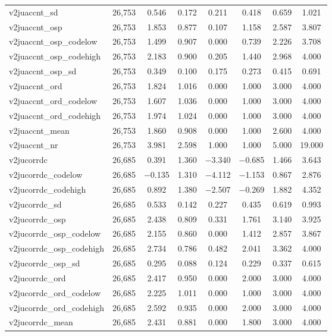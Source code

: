 \begin{table}[!htbp]
\begin{tabular}{@{\extracolsep{5pt}}lccccccc}
v2juaccnt\_sd & 26,753 & 0.546 & 0.172 & 0.211 & 0.418 & 0.659 & 1.021 \\ 
v2juaccnt\_osp & 26,753 & 1.853 & 0.877 & 0.107 & 1.158 & 2.587 & 3.807 \\ 
v2juaccnt\_osp\_codelow & 26,753 & 1.499 & 0.907 & 0.000 & 0.739 & 2.226 & 3.708 \\ 
v2juaccnt\_osp\_codehigh & 26,753 & 2.183 & 0.900 & 0.205 & 1.440 & 2.968 & 4.000 \\ 
v2juaccnt\_osp\_sd & 26,753 & 0.349 & 0.100 & 0.175 & 0.273 & 0.415 & 0.691 \\ 
v2juaccnt\_ord & 26,753 & 1.824 & 1.016 & 0.000 & 1.000 & 3.000 & 4.000 \\ 
v2juaccnt\_ord\_codelow & 26,753 & 1.607 & 1.036 & 0.000 & 1.000 & 3.000 & 4.000 \\ 
v2juaccnt\_ord\_codehigh & 26,753 & 1.974 & 1.024 & 0.000 & 1.000 & 3.000 & 4.000 \\ 
v2juaccnt\_mean & 26,753 & 1.860 & 0.908 & 0.000 & 1.000 & 2.600 & 4.000 \\ 
v2juaccnt\_nr & 26,753 & 3.981 & 2.598 & 1.000 & 1.000 & 5.000 & 19.000 \\ 
v2jucorrdc & 26,685 & 0.391 & 1.360 & $-$3.340 & $-$0.685 & 1.466 & 3.643 \\ 
v2jucorrdc\_codelow & 26,685 & $-$0.135 & 1.310 & $-$4.112 & $-$1.153 & 0.867 & 2.876 \\ 
v2jucorrdc\_codehigh & 26,685 & 0.892 & 1.380 & $-$2.507 & $-$0.269 & 1.882 & 4.352 \\ 
v2jucorrdc\_sd & 26,685 & 0.533 & 0.142 & 0.227 & 0.435 & 0.619 & 0.993 \\ 
v2jucorrdc\_osp & 26,685 & 2.438 & 0.809 & 0.331 & 1.761 & 3.140 & 3.925 \\ 
v2jucorrdc\_osp\_codelow & 26,685 & 2.155 & 0.860 & 0.000 & 1.412 & 2.857 & 3.867 \\ 
v2jucorrdc\_osp\_codehigh & 26,685 & 2.734 & 0.786 & 0.482 & 2.041 & 3.362 & 4.000 \\ 
v2jucorrdc\_osp\_sd & 26,685 & 0.295 & 0.088 & 0.124 & 0.229 & 0.337 & 0.615 \\ 
v2jucorrdc\_ord & 26,685 & 2.417 & 0.950 & 0.000 & 2.000 & 3.000 & 4.000 \\ 
v2jucorrdc\_ord\_codelow & 26,685 & 2.225 & 1.011 & 0.000 & 1.000 & 3.000 & 4.000 \\ 
v2jucorrdc\_ord\_codehigh & 26,685 & 2.592 & 0.935 & 0.000 & 2.000 & 3.000 & 4.000 \\ 
v2jucorrdc\_mean & 26,685 & 2.431 & 0.881 & 0.000 & 1.800 & 3.000 & 4.000 \\ 

\end{tabular}
\end{table}
